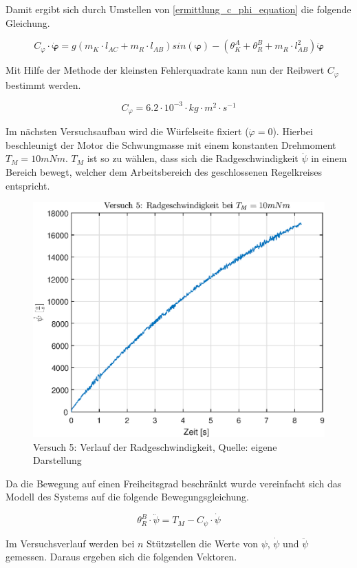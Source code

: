 Damit ergibt sich durch Umstellen von \ref{ermittlung_c_phi_equation} die folgende Gleichung.

\begin{equation}
C_{\varphi} \cdot \boldsymbol{\dot{\varphi}} = g(m_K \cdot l_{AC} + m_R \cdot l_{AB})sin(\boldsymbol{\varphi}) - (\theta^A_K + \theta^B_R + m_R  \cdot l_{AB}^2) \boldsymbol{\ddot{\varphi}}
\end{equation}

Mit Hilfe der Methode der kleinsten Fehlerquadrate kann nun der Reibwert $C_{\varphi}$ bestimmt werden.

\begin{equation}
C_{\varphi} = 6.2 \cdot 10^{-3} \cdot kg \cdot m^2 \cdot s^{-1}
\end{equation}


Im nächsten Versuchsaufbau wird die Würfelseite fixiert ($\dot{\varphi} = 0$). Hierbei beschleunigt der Motor die Schwungmasse mit einem konstanten Drehmoment $T_M=10mNm$. $T_M$ ist so zu wählen, dass sich die Radgeschwindigkeit $\dot{\psi}$ in einem Bereich bewegt, welcher dem Arbeitsbereich des geschlossenen Regelkreises entspricht. 

\begin{figure}[h!]
\centering
\includegraphics[width=0.5\linewidth]{img/V5_C_psi_d.eps}
\caption{Versuch 5: Verlauf der Radgeschwindigkeit, Quelle: eigene Darstellung}
\end{figure}


Da die Bewegung auf einen Freiheitsgrad beschränkt wurde vereinfacht sich das Modell des Systems auf die folgende Bewegungsgleichung.

\begin{equation}
\label{ermittlung_c_psi_equation}
\theta^B_R \cdot \ddot{\psi} = T_M - C_\psi \cdot \dot{\psi}
\end{equation}

Im Versuchsverlauf werden bei $n$ Stützstellen die Werte von $\psi$, $\dot{\psi}$ und $\ddot{\psi}$ gemessen. Daraus ergeben sich die folgenden Vektoren.

